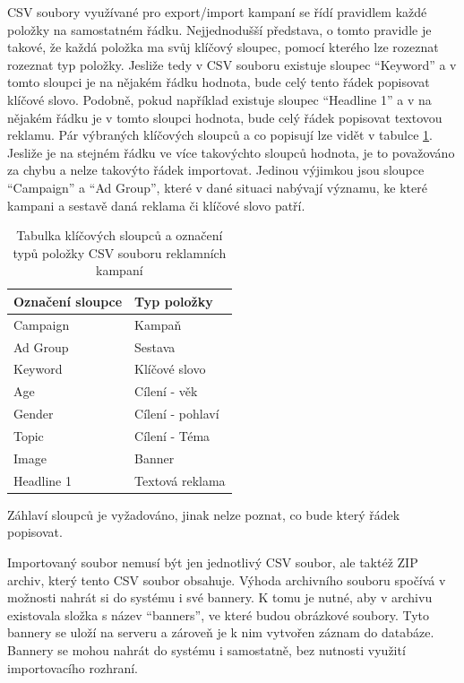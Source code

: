 CSV soubory využívané pro export/import kampaní se řídí pravidlem každé položky na samostatném řádku. \cite{sklik:csv} Nejjednodušší představa, o tomto pravidle je takové, že
každá položka ma svůj klíčový sloupec, pomocí kterého lze rozeznat rozeznat typ položky. Jesliže tedy v CSV souboru existuje sloupec \enquote{Keyword} a v tomto sloupci je
na nějakém řádku hodnota, bude celý tento řádek popisovat klíčové slovo. Podobně, pokud například existuje sloupec \enquote{Headline 1} a v na nějakém řádku 
je v tomto sloupci hodnota, bude celý řádek popisovat textovou reklamu. Pár výbraných klíčových sloupců a co popisují lze vidět v tabulce \ref{tab:csv-columns}.
Jesliže je na stejném řádku ve více takovýchto sloupců hodnota, je to považováno za chybu a nelze takovýto řádek importovat. Jedinou výjimkou jsou sloupce
\enquote{Campaign} a \enquote{Ad Group}, které v dané situaci nabývají významu, ke které kampani a sestavě daná reklama či klíčové slovo patří.

\begin{table}[h]
    \centering
    \begin{tabular}{ |l|l| }
        \hline
        Označení sloupce & Typ položky \\
        \hline
        Campaign & Kampaň \\
        Ad Group & Sestava \\
        Keyword & Klíčové slovo \\
        Age & Cílení - věk \\
        Gender & Cílení - pohlaví \\
        Topic & Cílení - Téma \\
        Image & Banner \\
        Headline 1 & Textová reklama \\
        \hline
    \end{tabular}
    \caption{Tabulka klíčových sloupců a označení typů položky CSV souboru reklamních kampaní}
    \label{tab:csv-columns}
\end{table}

Záhlaví sloupců je vyžadováno, jinak nelze poznat, co bude který řádek popisovat.

Importovaný soubor nemusí být jen jednotlivý CSV soubor, ale taktéž ZIP archiv, který tento CSV soubor obsahuje.
Výhoda archivního souboru spočívá v možnosti nahrát si do systému i své bannery. K tomu je nutné, aby
v archivu existovala složka s název \enquote{banners}, ve které budou obrázkové soubory. Tyto bannery se uloží na serveru a zároveň
je k nim vytvořen záznam do databáze. Bannery se mohou nahrát do systému i samostatně, bez nutnosti využití importovacího rozhraní.


